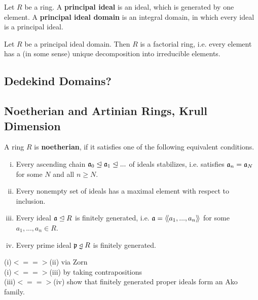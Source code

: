 	\begin{definition}
		Let $R$ be a ring. A \textbf{principal ideal} is an ideal, which is generated by one element. A \textbf{principal ideal domain} is an integral domain, in which every ideal is a principal ideal.
	\end{definition}

	\begin{theorem}
		Let $R$ be a principal ideal domain. Then $R$ is a factorial ring, i.e. every element has a (in some sense) unique decomposition into irreducible elements.
	\end{theorem}

	\subsection{Dedekind Domains?}

	\newpage
	\subsection{Noetherian and Artinian Rings, Krull Dimension}

	\begin{definition}
		A ring $R$ is \textbf{noetherian}, if it satisfies one of the following equivalent conditions.
		\begin{enumerate}[(i)]
			\item{
				Every ascending chain $\mathfrak{a}_0 \trianglelefteq \mathfrak{a}_1 \trianglelefteq ...$ of ideals stabilizes, i.e. satisfies $\mathfrak{a}_n = \mathfrak{a}_N$ for some $N$ and all $n \geq N$.
			}
			\item{
				Every nonempty set of ideals has a maximal element with respect to inclusion.
			}
			\item{
				Every ideal $\mathfrak{a} \trianglelefteq R$ is finitely generated, i.e. $\mathfrak{a} = \langle\!\langle a_1,...,a_n \rangle\!\rangle$ for some $a_1,...,a_n \in R$.
			}
			\item{
				Every prime ideal $\ideal{p} \divneq R$ is finitely generated.
			}
		\end{enumerate}
	\end{definition}
	\begin{sketch}
		(i)$<==>$(ii) via Zorn\\
		(i)$<==>$(iii) by taking contrapositions\\
		(iii)$<==>$(iv) show that finitely generated proper ideals form an Ako family.
	\end{sketch}

